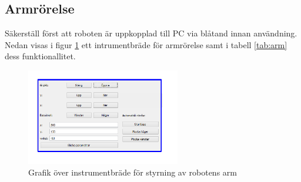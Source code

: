 \documentclass[a4paper,12pt]{article}
\begin{document}
\subsection{Armrörelse}
Säkerställ först att roboten är uppkopplad till PC via blåtand innan användning. Nedan visas i figur \ref{fig:pc_arm} ett intrumentbräde för armrörelse samt i tabell \ref{tab:arm} dess funktionallitet.

\begin{figure}[H]
	\centering
	\includegraphics[width=0.6\textwidth]{armrorelse.pdf}
	\caption{Grafik över instrumentbräde för styrning av robotens arm}
	\label{fig:pc_arm}
\end{figure}
\end{document}
